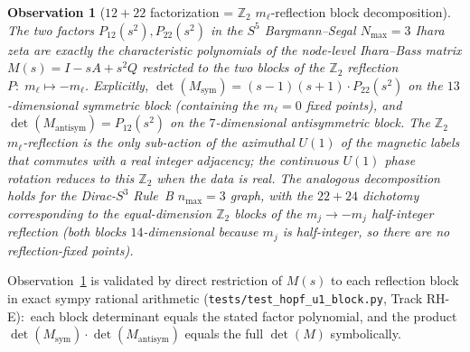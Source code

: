 \documentclass[11pt]{article}
\newtheorem{observation}{Observation}
\begin{document}
\begin{observation}[$12+22$ factorization = $\mathbb{Z}_2$
$m_\ell$-reflection block decomposition]
\label{obs:12_22}
The two factors $P_{12}(s^2), P_{22}(s^2)$ in the $S^5$
Bargmann--Segal $N_{\max}=3$ Ihara zeta are exactly the characteristic
polynomials of the node-level Ihara--Bass matrix
$M(s) = I - sA + s^2 Q$ restricted to the two blocks of the
$\mathbb{Z}_2$ reflection $P:\; m_\ell\mapsto -m_\ell$.
Explicitly, $\det(M_{\text{sym}}) = (s-1)(s+1)\cdot P_{22}(s^2)$ on the
$13$-dimensional symmetric block (containing the $m_\ell=0$ fixed
points), and $\det(M_{\text{antisym}}) = P_{12}(s^2)$ on the
$7$-dimensional antisymmetric block.  The $\mathbb{Z}_2$ $m_\ell$-reflection
is the only sub-action of the azimuthal $U(1)$ of the magnetic labels
that commutes with a real integer adjacency; the continuous $U(1)$ phase
rotation reduces to this $\mathbb{Z}_2$ when the data is real.
The analogous decomposition holds for the Dirac-$S^3$ Rule~B
$n_{\max}=3$ graph, with the $22+24$ dichotomy corresponding to the
equal-dimension $\mathbb{Z}_2$ blocks of the $m_j\to-m_j$
half-integer reflection (both blocks $14$-dimensional because $m_j$
is half-integer, so there are no reflection-fixed points).
\end{observation}

Observation~\ref{obs:12_22} is validated by direct restriction of
$M(s)$ to each reflection block in exact sympy rational arithmetic
(\texttt{tests/test\_hopf\_u1\_block.py}, Track RH-E):\ each block
determinant equals the stated factor polynomial, and the product
$\det(M_{\text{sym}})\cdot\det(M_{\text{antisym}})$ equals the full
$\det(M)$ symbolically.
\end{document}
